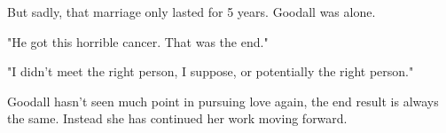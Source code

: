 \documentclass[12pt]{report}
\begin{document}
But sadly, that marriage only lasted for 5 years. Goodall was alone.

"He got this horrible cancer. That was the end."

"I didn't meet the right person, I suppose, or potentially the right person."

Goodall hasn't seen much point in pursuing love again, the end result is always
the same. Instead she has continued her work moving forward.

\pagebreak
\end{document}
